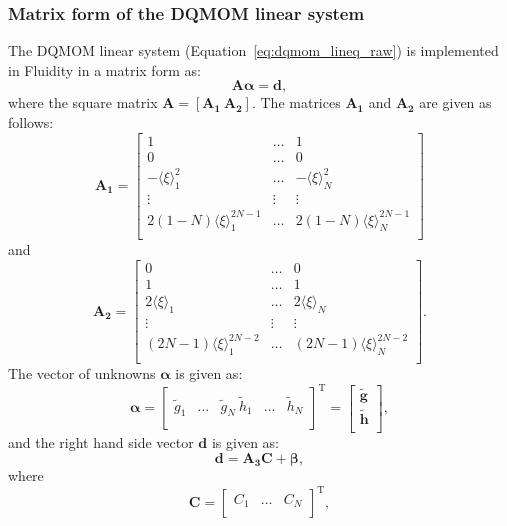\subsubsection{Matrix form of the DQMOM linear system}
The DQMOM linear system (Equation~\eqref{eq:dqmom_lineq_raw}) is implemented in Fluidity in a matrix form as:
\begin{equation} \label{eq:dqmom_matrix_eqn}
\mathbf{A} \pmb{\alpha} = \mathbf{d},
\end{equation}
where the square matrix $\mathbf{A} = \left[ \mathbf{A_1} \ \mathbf{A_2} \right ]$. The matrices  $\mathbf{A_1}$ and $\mathbf{A_2}$ are given as follows:
\begin{equation} \label{eq:dqmom_matrix_A1}
\mathbf{A_1} = 	\begin{bmatrix}
		1 & \dots & 1 \\
		0 & \dots & 0 \\
		-\langle \xi \rangle_1^2 & \dots & -\langle \xi \rangle_N^2 \\
		\vdots & \vdots & \vdots \\
		2 (1-N) \langle \xi \rangle_1^{2N-1} & \dots & 2 (1-N) \langle \xi \rangle_N^{2N-1} \\		
		\end{bmatrix}
\end{equation}
and
\begin{equation} \label{eq:dqmom_matrix_A2}
\mathbf{A_2} = 	\begin{bmatrix}
		0 & \dots & 0 \\
		1 & \dots & 1 \\
		2 \langle \xi \rangle_1 & \dots & 2 \langle \xi \rangle_N \\
		\vdots & \vdots & \vdots \\
		(2N-1) \langle \xi \rangle_1^{2N-2} & \dots & (2N-1) \langle \xi \rangle_N^{2N-2} \\		
		\end{bmatrix}.
\end{equation}
The vector of unknowns $\pmb{\alpha}$ is given as:
\begin{equation}
\pmb{\alpha} = 	\begin{bmatrix}
		\widetilde{g}_{1} & \dots & \widetilde{g}_{N} \ \widetilde{h}_{1} & \dots & \widetilde{h}_{N} \\	
		\end{bmatrix}^\mathrm{T} = 
		\begin{bmatrix}
		\mathbf{\widetilde{g}}\\	
		\mathbf{\widetilde{h}}\\
		\end{bmatrix},
\end{equation}
and the right hand side vector $\mathbf{d}$ is given as:
\begin{equation} \label{eq:vector_d_eqn}
\mathbf{d} = \mathbf{A_3} \mathbf{C} + \pmb{\beta},
\end{equation}
where 
\begin{equation} \label{eq:C}
\mathbf{C} = 	\begin{bmatrix}
		C_1 & \dots & C_N \\	
		\end{bmatrix}^\mathrm{T},
\end{equation}

